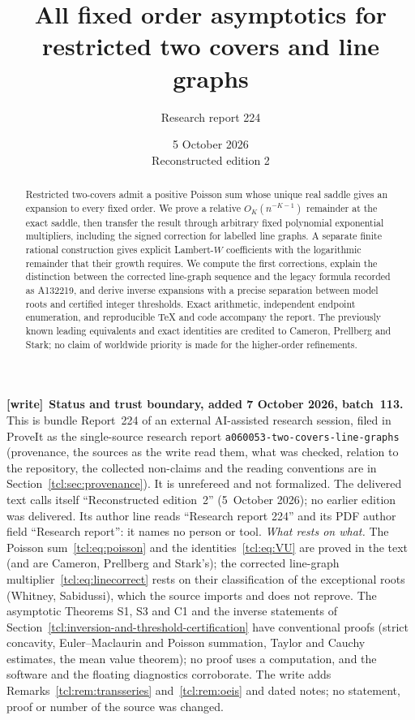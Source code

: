 \documentclass[11pt,letterpaper]{article}
\title{All fixed order asymptotics for restricted two covers and line graphs}
\author{Research report 224}
\date{5 October 2026\\Reconstructed edition 2}
\theoremstyle{remark}\newtheorem{remark}[theorem]{Remark}
\newcommand{\file}[1]{\nolinkurl{#1}}
\newenvironment{writenote}[1][]{\par\smallskip\begingroup\small
 \noindent\textbf{[write]}\if\relax\detokenize{#1}\relax\else~\textbf{#1.}\fi\ }%
 {\par\endgroup\smallskip}
\begin{document}
\maketitle
\begin{abstract}
Restricted two-covers admit a positive Poisson sum whose unique real saddle gives an expansion to every fixed order. We prove a relative $O_K(n^{-K-1})$ remainder at the exact saddle, then transfer the result through arbitrary fixed polynomial exponential multipliers, including the signed correction for labelled line graphs. A separate finite rational construction gives explicit Lambert-$W$ coefficients with the logarithmic remainder that their growth requires. We compute the first corrections, explain the distinction between the corrected line-graph sequence and the legacy formula recorded as A132219, and derive inverse expansions with a precise separation between model roots and certified integer thresholds. Exact arithmetic, independent endpoint enumeration, and reproducible TeX and code accompany the report. The previously known leading equivalents and exact identities are credited to Cameron, Prellberg and Stark; no claim of worldwide priority is made for the higher-order refinements.
\end{abstract}
\begin{writenote}[Status and trust boundary, added 7 October 2026, batch~113]
This is bundle Report~224 of an external AI-assisted research session, filed
in ProveIt as the single-source research report
\file{a060053-two-covers-line-graphs} (provenance, the sources as the write
read them, what was checked, relation to the repository, the collected
non-claims and the reading conventions are in
Section~\ref{tcl:sec:provenance}). It is unrefereed and not formalized. The
delivered text calls itself ``Reconstructed edition~2'' (5~October 2026); no
earlier edition was delivered. Its author line reads ``Research report 224''
and its PDF author field ``Research report'': it names no person or tool.
\emph{What rests on what.} The Poisson sum~\eqref{tcl:eq:poisson} and the
identities~\eqref{tcl:eq:VU} are proved in the text (and are Cameron, Prellberg
and Stark's); the corrected line-graph multiplier~\eqref{tcl:eq:linecorrect}
rests on their classification of the exceptional roots (Whitney, Sabidussi),
which the source imports and does not reprove. The asymptotic Theorems S1, S3
and C1 and the inverse statements of Section~\ref{tcl:inversion-and-threshold-certification}
have conventional proofs (strict concavity, Euler--Maclaurin and Poisson
summation, Taylor and Cauchy estimates, the mean value theorem); no proof uses
a computation, and the software and the floating diagnostics corroborate. The
write adds Remarks~\ref{tcl:rem:transseries} and~\ref{tcl:rem:oeis} and dated
notes; no statement, proof or number of the source was changed.
\end{writenote}
\tableofcontents
\newpage






\end{document}
